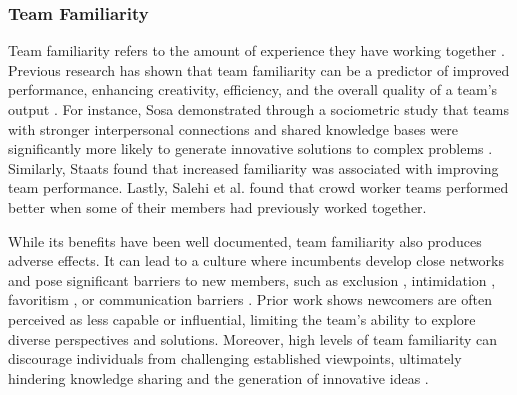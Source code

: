 \subsubsection{Team Familiarity}
Team familiarity refers to the amount of experience they have working together \cite{muskat2022team,mukherjee2019prior}. Previous research has shown that team familiarity can be a predictor of improved performance, enhancing creativity, efficiency, and the overall quality of a team's output \cite{dittmer2020cut, huckman2009team, witmer2022systematic}. For instance, Sosa demonstrated through a sociometric study that teams with stronger interpersonal connections and shared knowledge bases were significantly more likely to generate innovative solutions to complex problems \cite{sosa2011creative}. Similarly, Staats \cite{staats2012unpacking} found that increased familiarity was associated with improving team performance. Lastly, Salehi et al. \cite{10.1145/2998181.2998300} found that crowd worker teams performed better when some of their members had previously worked together. 

While its benefits have been well documented, team familiarity also produces adverse effects. It can lead to a culture where incumbents develop close networks and pose significant barriers to new members, such as exclusion \cite{choi2004minority, joardar2007experimental}, intimidation \cite{topa2016newcomers}, favoritism \cite{balthazard2006dysfunctional}, or communication barriers \cite{kraut2010dealing}. Prior work shows newcomers are often perceived as less capable or influential, limiting the team's ability to explore diverse perspectives and solutions. Moreover, high levels of team familiarity can discourage individuals from challenging established viewpoints, ultimately hindering knowledge sharing and the generation of innovative ideas \cite{assudani2011role, xie2020curvilinear}.

